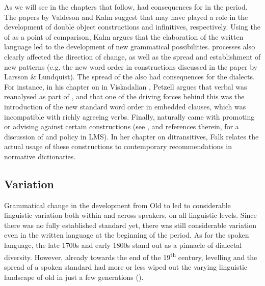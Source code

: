 \documentclass[output=paper]{langscibook}
\begin{document}
As we will see in the chapters that follow,  had consequences for  in the  period. The papers by Valdeson and Kalm suggest that  may have played a role in the development of double object constructions and  infinitives, respectively. Using the  of  as a point of comparison, Kalm argues that the elaboration of the written language led to the development of new grammatical possibilities.  processes also clearly affected the direction of change, as well as the spread and establishment of new patterns (e.g. the new word order in  constructions discussed in the paper by Larsson \& Lundquist). The spread of the  also had consequences for the dialects. For instance, in his chapter on  in Viskadalian , Petzell argues that verbal  was reanalysed as part of , and that one of the driving forces behind this  was the introduction of the new standard word order in embedded clauses, which was incompatible with richly agreeing verbs. Finally,  naturally came with  promoting or advising against certain constructions (see \citealt{Teleman2002, Teleman2003Tradis}, and references therein, for a discussion of  and policy in LMS). In her chapter on  ditransitives, Falk relates the actual usage of these constructions to contemporary recommendations in normative dictionaries. 


\subsection{Variation}\label{sec:intro:2.2}


Grammatical change in the development from Old to  led to considerable linguistic variation both within and across speakers, on all linguistic levels. Since there was no fully established standard yet, there was still considerable variation even in the written language at the beginning of the  period. As for the spoken language, the late 1700s and early 1800s stand out as a pinnacle of dialectal diversity. However, already towards the end of the 19\textsuperscript{th} century,  levelling and the spread of a spoken standard had more or less wiped out the varying linguistic landscape of old in just a few generations (\citealt{NilssonPetzell2015}).
\end{document}

